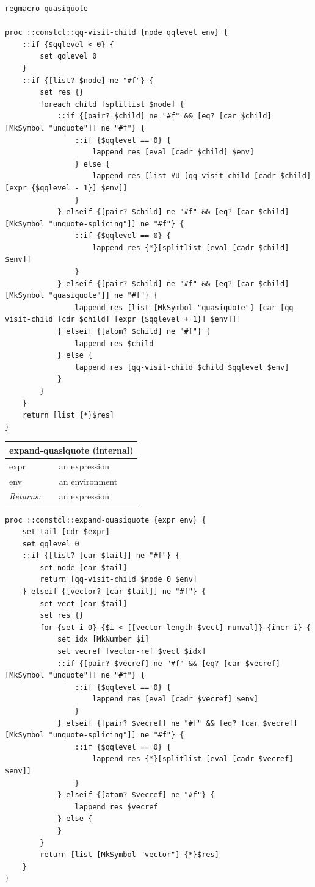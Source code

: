 \documentclass[twoside,9pt]{report}
\begin{document}
\noindent\makebox[\linewidth]{\rule{\linewidth}{0.4pt}}
\begin{lstlisting}
regmacro quasiquote
 
proc ::constcl::qq-visit-child {node qqlevel env} {
    ::if {$qqlevel < 0} {
        set qqlevel 0
    }
    ::if {[list? $node] ne "#f"} {
        set res {}
        foreach child [splitlist $node] {
            ::if {[pair? $child] ne "#f" && [eq? [car $child] [MkSymbol "unquote"]] ne "#f"} {
                ::if {$qqlevel == 0} {
                    lappend res [eval [cadr $child] $env]
                } else {
                    lappend res [list #U [qq-visit-child [cadr $child] [expr {$qqlevel - 1}] $env]]
                }
            } elseif {[pair? $child] ne "#f" && [eq? [car $child] [MkSymbol "unquote-splicing"]] ne "#f"} {
                ::if {$qqlevel == 0} {
                    lappend res {*}[splitlist [eval [cadr $child] $env]]
                }
            } elseif {[pair? $child] ne "#f" && [eq? [car $child] [MkSymbol "quasiquote"]] ne "#f"} {
                lappend res [list [MkSymbol "quasiquote"] [car [qq-visit-child [cdr $child] [expr {$qqlevel + 1}] $env]]] 
            } elseif {[atom? $child] ne "#f"} {
                lappend res $child
            } else {
                lappend res [qq-visit-child $child $qqlevel $env]
            }
        }
    }
    return [list {*}$res]
}
\end{lstlisting}
\noindent\makebox[\linewidth]{\rule{\linewidth}{0.4pt}}
\begin{tabular}{ |l l| }
\hline
\multicolumn{2}{|l|}{expand-quasiquote (internal)} \\
\hline
expr & an expression \\
env & an environment \\
\textit{Returns:} & an expression \\
\hline
\end{tabular}

\noindent\makebox[\linewidth]{\rule{\linewidth}{0.4pt}}
\begin{lstlisting}
proc ::constcl::expand-quasiquote {expr env} {
    set tail [cdr $expr]
    set qqlevel 0
    ::if {[list? [car $tail]] ne "#f"} {
        set node [car $tail]
        return [qq-visit-child $node 0 $env]
    } elseif {[vector? [car $tail]] ne "#f"} {
        set vect [car $tail]
        set res {}
        for {set i 0} {$i < [[vector-length $vect] numval]} {incr i} {
            set idx [MkNumber $i]
            set vecref [vector-ref $vect $idx]
            ::if {[pair? $vecref] ne "#f" && [eq? [car $vecref] [MkSymbol "unquote"]] ne "#f"} {
                ::if {$qqlevel == 0} {
                    lappend res [eval [cadr $vecref] $env]
                }
            } elseif {[pair? $vecref] ne "#f" && [eq? [car $vecref] [MkSymbol "unquote-splicing"]] ne "#f"} {
                ::if {$qqlevel == 0} {
                    lappend res {*}[splitlist [eval [cadr $vecref] $env]]
                }
            } elseif {[atom? $vecref] ne "#f"} {
                lappend res $vecref
            } else {
            }
        }
        return [list [MkSymbol "vector"] {*}$res]
    }
}
\end{lstlisting}
\noindent\makebox[\linewidth]{\rule{\linewidth}{0.4pt}}
\end{document}
